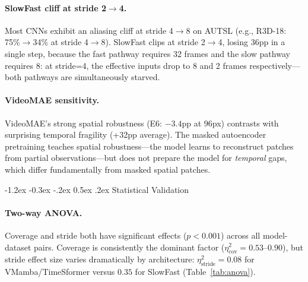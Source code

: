 \documentclass[runningheads]{llncs}
\makeatletter
\renewcommand\subsection{\@startsection{subsection}{2}{\z@}%
                       {-1.2ex \@plus -0.3ex \@minus -.2ex}%
                       {0.5ex \@plus .2ex}%
                       {\normalfont\normalsize\bfseries\boldmath}}
\makeatother
\begin{document}
\paragraph{SlowFast cliff at stride 2$\to$4.}
Most CNNs exhibit an aliasing cliff at stride 4$\to$8 on AUTSL (e.g., R3D-18:
75\%$\to$34\% at stride 4$\to$8).
SlowFast clips at stride 2$\to$4, losing 36pp in a single step,
because the fast pathway requires 32 frames and the slow pathway requires 8:
at stride=4, the effective inputs drop to 8 and 2 frames respectively—both
pathways are simultaneously starved.

\paragraph{VideoMAE sensitivity.}
VideoMAE's strong spatial robustness (E6: $-3.4$pp at 96px) contrasts with
surprising temporal fragility (+32pp average).
The masked autoencoder pretraining teaches spatial robustness—the model learns
to reconstruct patches from partial observations—but does not prepare the model
for \emph{temporal} gaps, which differ fundamentally from masked spatial patches.

\subsection{Statistical Validation}

\paragraph{Two-way ANOVA.}
Coverage and stride both have significant effects ($p < 0.001$) across all
model-dataset pairs.
Coverage is consistently the dominant factor ($\eta^2_{\text{cov}} = 0.53$--$0.90$),
but stride effect size varies dramatically by architecture:
$\eta^2_{\text{stride}} = 0.08$ for VMamba/TimeSformer versus $0.35$ for SlowFast
(Table~\ref{tab:anova}).
\end{document}
